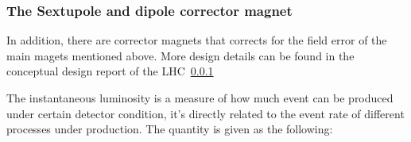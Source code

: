 \subsubsection{The Sextupole and dipole corrector magnet}
In addition, there are corrector magnets that corrects for the field error of the main magets mentioned above. More design details can be found in the conceptual design report of the LHC~\ref{}






The instantaneous luminosity is a measure of how much event can be produced under certain detector condition, it's directly related to the event rate of different processes under production.   
The quantity is given as the following:

